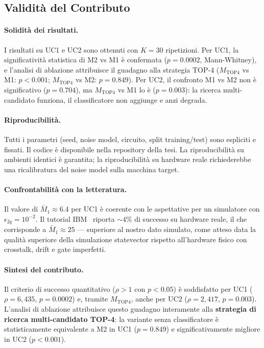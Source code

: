 \begin{onehalfspace}
\section{Validità del Contributo}
\label{sec:validita}

\paragraph{Solidità dei risultati.}
I risultati su UC1 e UC2 sono ottenuti con $K=30$ ripetizioni. Per UC1, la significatività statistica di M2 vs M1 è confermata ($p=0.0002$, Mann-Whitney), e l'analisi di ablazione attribuisce il guadagno alla strategia TOP-4 ($M_{\text{TOP4}}$ vs M1: $p<0.001$; $M_{\text{TOP4}}$ vs M2: $p=0.849$). Per UC2, il confronto M1 vs M2 non è significativo ($p=0.704$), ma $M_{\text{TOP4}}$ vs M1 lo è ($p=0.003$): la ricerca multi-candidato funziona, il classificatore non aggiunge e anzi degrada.

\paragraph{Riproducibilità.}
Tutti i parametri (seed, noise model, circuito, split training/test) sono espliciti e fissati. Il codice è disponibile nella repository della tesi. La riproducibilità su ambienti identici è garantita; la riproducibilità su hardware reale richiederebbe una ricalibratura del noise model sulla macchina target.

\paragraph{Confrontabilità con la letteratura.}
Il valore di $\bar{M}_1 \approx 6.4$ per UC1 è coerente con le aspettative per un simulatore con $\epsilon_{2q} = 10^{-2}$. Il tutorial IBM~\cite{ibm_shor_tutorial} riporta $\sim 4\%$ di successo su hardware reale, il che corrisponde a $\bar{M}_1 \approx 25$ --- superiore al nostro dato simulato, come atteso data la qualità superiore della simulazione statevector rispetto all'hardware fisico con crosstalk, drift e gate imperfetti.

\paragraph{Sintesi del contributo.}
Il criterio di successo quantitativo ($\rho > 1$ con $p < 0.05$) è soddisfatto per UC1 ($\rho = 6{,}435$, $p = 0.0002$) e, tramite $M_{\text{TOP4}}$, anche per UC2 ($\rho = 2{,}417$, $p = 0.003$). L'analisi di ablazione attribuisce questo guadagno interamente alla \textbf{strategia di ricerca multi-candidato TOP-4}: la variante senza classificatore è statisticamente equivalente a M2 in UC1 ($p = 0.849$) e significativamente migliore in UC2 ($p < 0.001$).


\end{onehalfspace}
